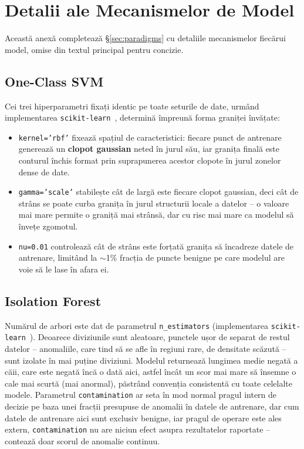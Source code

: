 \chapter{Detalii ale Mecanismelor de Model}
\label{sec:model-mechanisms}

Această anexă completează \S\ref{sec:paradigms} cu detaliile mecanismelor fiecărui model, omise din textul principal pentru concizie.

\section{One-Class SVM}

Cei trei hiperparametri fixați identic pe toate seturile de date, urmând implementarea \texttt{scikit-learn}~\parencite{sklearn_ocsvm}, determină împreună forma graniței învățate:

\begin{itemize}
  \item \texttt{kernel='rbf'} fixează spațiul de caracteristici: fiecare punct de antrenare generează un \textbf{clopot gaussian} neted în jurul său, iar granița finală este conturul închis format prin suprapunerea acestor clopote în jurul zonelor dense de date.
  \item \texttt{gamma='scale'} stabilește cât de largă este fiecare clopot gaussian, deci cât de strâns se poate curba granița în jurul structurii locale a datelor -- o valoare mai mare permite o graniță mai strânsă, dar cu risc mai mare ca modelul să învețe zgomotul.
  \item \texttt{nu=0.01} controlează cât de strâns este forțată granița să încadreze datele de antrenare, limitând la $\sim$1\% fracția de puncte benigne pe care modelul are voie să le lase în afara ei.
\end{itemize}

\section{Isolation Forest}

Numărul de arbori este dat de parametrul \texttt{n\_estimators} (implementarea \texttt{scikit-learn}~\parencite{sklearn_iforest}). Deoarece diviziunile sunt aleatoare, punctele ușor de separat de restul datelor -- anomaliile, care tind să se afle în regiuni rare, de densitate scăzută -- sunt izolate în mai puține diviziuni. Modelul returnează lungimea medie negată a căii, care este negată încă o dată aici, astfel încât un scor mai mare să însemne o cale mai scurtă (mai anormal), păstrând convenția consistentă cu toate celelalte modele. Parametrul \texttt{contamination} ar seta în mod normal pragul intern de decizie pe baza unei fracții presupuse de anomalii în datele de antrenare, dar cum datele de antrenare aici sunt exclusiv benigne, iar pragul de operare este ales extern, \texttt{contamination} nu are niciun efect asupra rezultatelor raportate -- contează doar scorul de anomalie continuu.


